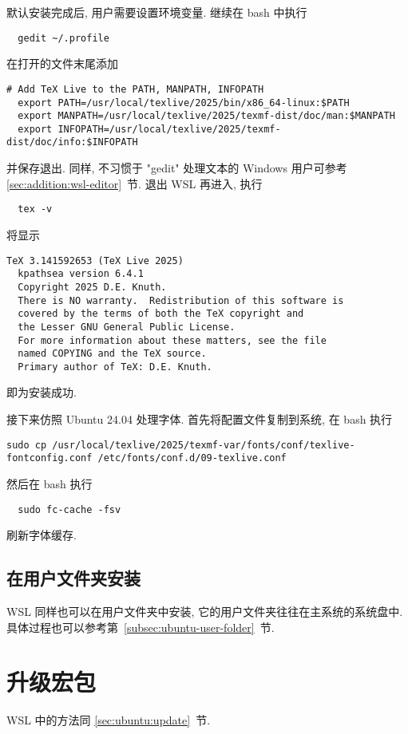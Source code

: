 默认安装完成后, 用户需要设置环境变量.
继续在 \textsf{bash} 中执行
\begin{lstlisting}
  gedit ~/.profile
\end{lstlisting}
在打开的文件末尾添加
\begin{lstlisting}[deletekeywords = local]
  # Add TeX Live to the PATH, MANPATH, INFOPATH
  export PATH=/usr/local/texlive/2025/bin/x86_64-linux:$PATH
  export MANPATH=/usr/local/texlive/2025/texmf-dist/doc/man:$MANPATH
  export INFOPATH=/usr/local/texlive/2025/texmf-dist/doc/info:$INFOPATH
\end{lstlisting}
并保存退出.
同样,
不习惯于 "gedit" 处理文本的 Windows 用户可参考 \ref{sec:addition:wsl-editor}~节.
退出 WSL 再进入,
执行
\begin{lstlisting}
  tex -v
\end{lstlisting}
将显示
\begin{lstlisting}[language = {}]
  TeX 3.141592653 (TeX Live 2025)
  kpathsea version 6.4.1
  Copyright 2025 D.E. Knuth.
  There is NO warranty.  Redistribution of this software is
  covered by the terms of both the TeX copyright and
  the Lesser GNU General Public License.
  For more information about these matters, see the file
  named COPYING and the TeX source.
  Primary author of TeX: D.E. Knuth.
\end{lstlisting}
即为安装成功.

接下来仿照 Ubuntu 24.04 处理字体.
首先将配置文件复制到系统,
在 \textsf{bash} 执行
\begin{lstlisting}[deletekeywords = local]
  sudo cp /usr/local/texlive/2025/texmf-var/fonts/conf/texlive-fontconfig.conf /etc/fonts/conf.d/09-texlive.conf
\end{lstlisting}
然后在 \textsf{bash} 执行
\begin{lstlisting}
  sudo fc-cache -fsv
\end{lstlisting}
刷新字体缓存.

\subsection{在用户文件夹安装}

WSL 同样也可以在用户文件夹中安装,
它的用户文件夹往往在主系统的系统盘中.
具体过程也可以参考第~\ref{subsec:ubuntu-user-folder}~节.

\section{升级宏包}

WSL 中的方法同 \ref{sec:ubuntu:update}~节.

